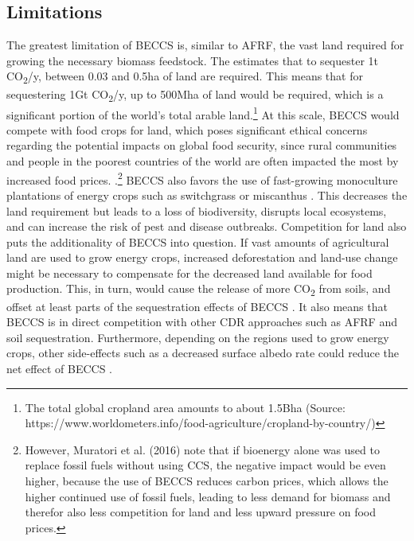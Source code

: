 \subsection*{Limitations}
The greatest limitation of BECCS is, similar to AFRF, the vast land required for growing the necessary biomass feedstock. The \textcite{IPCC2018Global1.5C} estimates that to sequester 1t CO\textsubscript{2}/y, between 0.03 and 0.5ha of land are required. This means that for sequestering 1Gt CO\textsubscript{2}/y, up to 500Mha of land would be required, which is a significant portion of the world's total arable land.\footnote{The total global cropland area amounts to about 1.5Bha (Source: https://www.worldometers.info/food-agriculture/cropland-by-country/)} At this scale, BECCS would compete with food crops for land, which poses significant ethical concerns regarding the potential impacts on global food security, since rural communities and people in the poorest countries of the world are often impacted the most by increased food prices. \parencite{Anderson2017TheBECCS, Hanssen2020TheStorage}.\footnote{However, Muratori et al. (2016) note that if bioenergy alone was used to replace fossil fuels without using CCS, the negative impact would be even higher, because the use of BECCS reduces carbon prices, which allows the higher continued use of fossil fuels, leading to less demand for biomass and therefor also less competition for land and less upward pressure on food prices.}
BECCS also favors the use of fast-growing monoculture plantations of energy crops such as switchgrass or miscanthus \parencite{Fajardy2017CanEmissions}. This decreases the land requirement but leads to a loss of biodiversity, disrupts local ecosystems, and can increase the risk of pest and disease outbreaks.
Competition for land also puts the additionality of BECCS into question. If vast amounts of agricultural land are used to grow energy crops, increased deforestation and land-use change might be necessary to compensate for the decreased land available for food production. This, in turn, would cause the release of more CO\textsubscript{2} from soils, and offset at least parts of the sequestration effects of BECCS \parencite{ChathamHouse2020ReachingWork, Muratori2016GlobalBECCS}. It also means that BECCS is in direct competition with other CDR approaches such as AFRF and soil sequestration.
Furthermore, depending on the regions used to grow energy crops, other side-effects such as a decreased surface albedo rate could reduce the net effect of BECCS \parencite{Hanssen2020TheStorage}.
